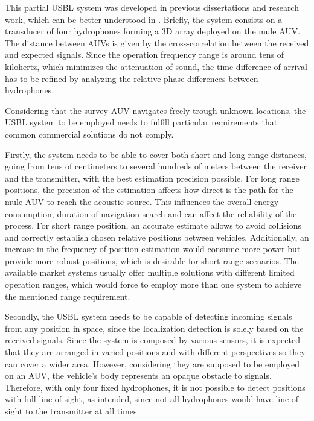 
This partial USBL system was developed in previous dissertations and research work, which can be better understood in \cite{afonso-thesis}. Briefly, the system consists on a transducer of four hydrophones forming a 3D array deployed on the mule AUV. The distance between AUVs is given by the cross-correlation between the received and expected signals. Since the operation frequency range is around tens of kilohertz, which minimizes the attenuation of sound, the time difference of arrival has to be refined by analyzing the relative phase differences between hydrophones.

Considering that the survey AUV navigates freely trough unknown locations, the USBL system to be employed needs to fulfill particular requirements that common commercial solutions do not comply. 

Firstly, the system needs to be able to cover both short and long range distances, going from tens of centimeters to several hundreds of meters between the receiver and the transmitter, with the best estimation precision possible. For long range positions, the precision of the estimation affects how direct is the path for the mule AUV to reach the acoustic source. This influences the overall energy consumption, duration of navigation search and can affect the reliability of the process. For short range position, an accurate estimate allows to avoid collisions and correctly establish chosen relative positions between vehicles. Additionally, an increase in the frequency of position estimation would consume more power but provide more robust positions, which is desirable for short range scenarios. The available market systems usually offer multiple solutions with different limited operation ranges, which would force to employ more than one system to achieve the mentioned range requirement.

Secondly, the USBL system needs to be capable of detecting incoming signals from any position in space, since the localization detection is solely based on the received signals. Since the system is composed by various sensors, it is expected that they are arranged in varied positions and with different perspectives so they can cover a wider area. However, considering they are supposed to be employed on an AUV, the vehicle's body represents an opaque obstacle to signals. Therefore, with only four fixed hydrophones, it is not possible to detect positions with full line of sight, as intended, since not all hydrophones would have line of sight to the transmitter at all times.

